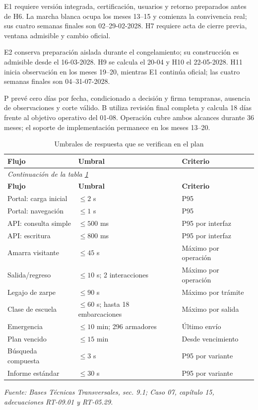 E1 requiere versión integrada, certificación, usuarios y retorno preparados antes de H6. La marcha blanca ocupa los meses 13--15 y comienza la convivencia real; sus cuatro semanas finales son 02--29-02-2028. H7 requiere acta de cierre previa, ventana admisible y cambio oficial.

E2 conserva preparación aislada durante el congelamiento; su construcción es admisible desde el 16-03-2028. H9 se calcula el 20-04 y H10 el 22-05-2028. H11 inicia observación en los meses 19--20, mientras E1 continúa oficial; las cuatro semanas finales son 04--31-07-2028.

P prevé cero días por fecha, condicionado a decisión y firma tempranas, ausencia de observaciones y corte válido. B utiliza revisión final completa y calcula 18 días frente al objetivo operativo del 01-08. Operación cubre ambos alcances durante 36 meses; el soporte de implementación permanece en los meses 13--20.


\begingroup\small\setlength{\tabcolsep}{3pt}
\begin{longtable}{p{}p{}p{}}
\caption{Umbrales de respuesta que se verifican en el plan}\label{tab:t18-respuesta}\\\hline
\textbf{Flujo} & \textbf{Umbral} & \textbf{Criterio}\\\hline\endfirsthead
\multicolumn{3}{l}{\textit{Continuación de la tabla \ref{tab:t18-respuesta}}}\\\hline
\textbf{Flujo} & \textbf{Umbral} & \textbf{Criterio}\\\hline\endhead
\hline\endfoot\hline\endlastfoot
Portal: carga inicial & $\leq 2$ s & P95\\\hline
Portal: navegación & $\leq 1$ s & P95\\\hline
API: consulta simple & $\leq 500$ ms & P95 por interfaz\\\hline
API: escritura & $\leq 800$ ms & P95 por interfaz\\\hline
Amarra visitante & $\leq 45$ s & Máximo por operación\\\hline
Salida/regreso & $\leq 10$ s; 2 interacciones & Máximo por operación\\\hline
Legajo de zarpe & $\leq 90$ s & Máximo por trámite\\\hline
Clase de escuela & $\leq 60$ s; hasta 18 embarcaciones & Máximo por salida\\\hline
Emergencia & $\leq 10$ min; 296 armadores & Último envío\\\hline
Plan vencido & $\leq 15$ min & Desde vencimiento\\\hline
Búsqueda compuesta & $\leq 3$ s & P95 por variante\\\hline
Informe estándar & $\leq 30$ s & P95 por variante\\\hline
\end{longtable}\endgroup
\noindent\textit{Fuente: Bases Técnicas Transversales, sec. 9.1; Caso 07, capítulo 15, adecuaciones RT-09.01 y RT-05.29.}

